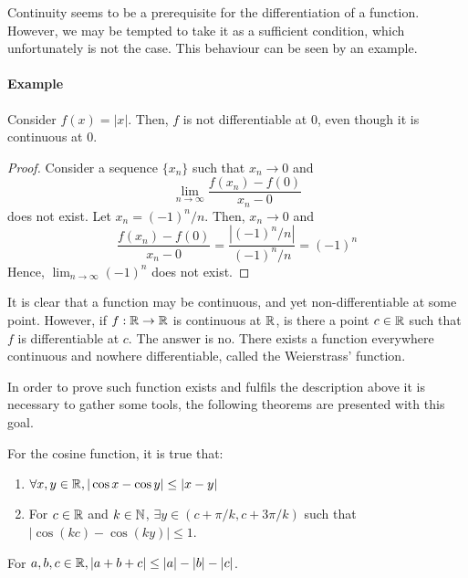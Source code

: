 Continuity seems to be a prerequisite for the differentiation of a function. However, we may be tempted to take it as a sufficient condition, which unfortunately is not the case. This behaviour can be seen by an example.

\paragraph{Example} Consider $f(x) = |x|$. Then, $f$ is not differentiable at $0$, even though it is continuous at $0$.

\begin{proof}
    Consider a sequence $\{x_n\}$ such that $x_n \to 0$ and
    \begin{equation*}
        \lim \limits_{n \to \infty} \frac{f(x_n) - f(0)}{x_n - 0}
    \end{equation*}
    does not exist. Let $x_n = (-1)^n/n$. Then, $x_n \to 0$ and 
    \begin{equation*}
        \frac{f(x_n)-f(0)}{x_n - 0} = \frac{|(-1)^n/n|}{(-1)^n/n} =(-1)^n
    \end{equation*}
    Hence, $\lim_{n \to \infty} (-1)^n$ does not exist.
\end{proof}

It is clear that a function may be continuous, and yet non-differentiable at some point. However, if $f: \mathbb{R} \to \mathbb{R}$ is continuous at $\mathbb{R}$, is there a point $c \in \mathbb{R}$ such that $f$ is differentiable at $c$. The answer is no. There exists a function everywhere continuous and nowhere differentiable, called the Weierstrass' function.

In order to prove such function exists and fulfils the description above it is necessary to gather some tools, the following theorems are presented with this goal.

\begin{theorem}
    For the cosine function, it is true that:
    \begin{enumerate}
        \item $\forall x, y \in \mathbb{R}, |\cos x - \cos y| \leq |x - y|$
        \item For $c \in \mathbb{R}$ and $k \in \mathbb{N}$, $\exists y \in (c + \pi/k, c + 3\pi/k)$ such that $|\cos(kc) - \cos(ky)| \leq 1$.
    \end{enumerate}
\end{theorem}

\begin{theorem}
    For $a, b, c \in \mathbb{R}, |a + b + c| \leq |a| - |b| - |c|$.
\end{theorem}

